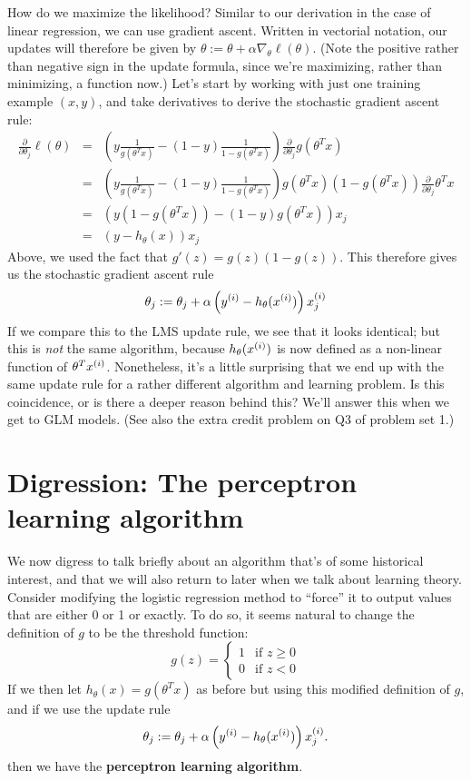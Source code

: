 \documentclass{article}
\begin{document}
How do we maximize the likelihood?  Similar to our derivation in the case
of linear regression, we can use gradient ascent.  Written in vectorial
notation, our updates will therefore be given by
$\theta := \theta + \alpha \nabla_\theta \ell(\theta)$.  (Note the
positive rather than negative sign in the update formula, since we're maximizing, rather
than minimizing, a function now.)  Let's start by working with just
one training example $(x,y)$, and take derivatives to derive the stochastic
gradient ascent rule:
\begin{eqnarray*}
\frac{\partial}{\partial \theta_j} \ell(\theta) &=&
\left(y \frac{1}{g(\theta^Tx)} - (1-y) \frac{1}{1-g(\theta^Tx)}\right)
\frac{\partial}{\partial \theta_j} g(\theta^Tx) \\
&=& \left(y \frac{1}{g(\theta^Tx)} - (1-y) \frac{1}{1-g(\theta^Tx)}\right)
g(\theta^Tx)(1-g(\theta^Tx))
\frac{\partial}{\partial \theta_j} \theta^Tx \\
&=& \left(y (1-g(\theta^Tx)) - (1-y) g(\theta^Tx) \right) x_j \\
&=& \left(y - h_\theta(x) \right) x_j
\end{eqnarray*}
Above, we used the fact that $g'(z) = g(z)(1-g(z))$. This therefore gives
us the stochastic gradient ascent rule
\[
\theta_j := \theta_j + \alpha \left({y^{(i)}} - h_\theta({x^{(i)}})\right) x^{(i)}_j
\]
If we compare this to the LMS update rule, we see that it looks identical;
but this is \emph{not} the same algorithm, because $h_\theta({x^{(i)}})$ is now
defined as a non-linear function of $\theta^T{x^{(i)}}$.  Nonetheless, it's a little
surprising that we end up with the same update rule for a rather different
algorithm and learning problem.  Is this coincidence, or is there a deeper
reason behind this?  We'll answer this when we get to GLM models.  (See also
the extra credit problem on Q3 of problem set 1.)

\section{Digression: The perceptron learning algorithm}

We now digress to talk briefly about an algorithm that's
of some historical interest, and that we will also return to later when
we talk about learning theory.  Consider
modifying the logistic regression method to ``force'' it to output values
that are either 0 or 1 or exactly.  To do so, it seems natural to change the definition
of $g$ to be the threshold function:
\[
 g(z) = \left\{\begin{array}{ll}
 1  & \mbox{if~} z \geq 0 \\
 0  & \mbox{if~} z < 0
\end{array} \right.
\]
If we then let $h_\theta(x) = g(\theta^Tx)$ as before but using this
modified definition of $g$, and if we use the update rule
\[
\theta_j := \theta_j + \alpha \left({y^{(i)}} - h_\theta({x^{(i)}})\right) x^{(i)}_j.
\]
then we have the {\bf perceptron learning algorithm}.
\end{document}
